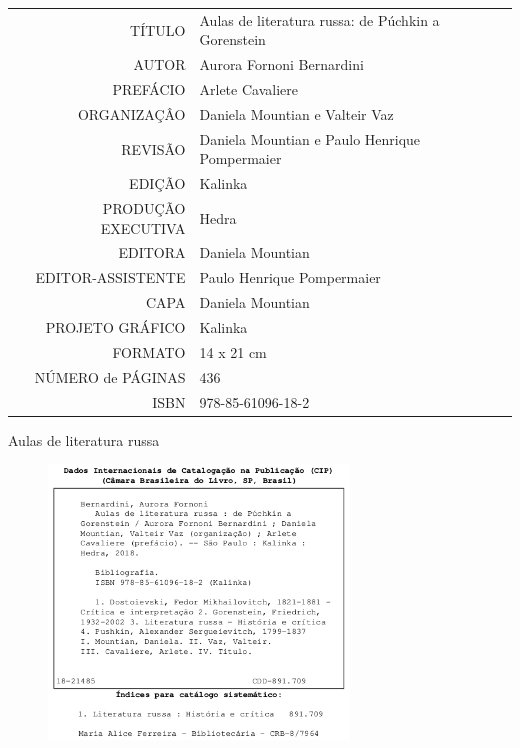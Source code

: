 \begin{vplace}[1]
\begin{table}[ht!]
\MyriadPro
\scriptsize
\begin{tabular}{rl}
TÍTULO            & Aulas de literatura russa: de Púchkin a Gorenstein \\[2pt]
AUTOR             & Aurora Fornoni Bernardini                          \\[2pt]
PREFÁCIO          & Arlete Cavaliere                                   \\[2pt]
ORGANIZAÇÂO       & Daniela Mountian e Valteir Vaz                     \\[2pt]
REVISÃO           & Daniela Mountian e Paulo Henrique Pompermaier      \\[2pt]
EDIÇÃO            & Kalinka                                            \\[2pt]
PRODUÇÃO EXECUTIVA & Hedra                                             \\[2pt]
EDITORA           & Daniela Mountian                                   \\[2pt] 
EDITOR-ASSISTENTE & Paulo Henrique Pompermaier                         \\[2pt]
CAPA              & Daniela Mountian                                   \\[2pt]
PROJETO GRÁFICO   & Kalinka                                            \\[2pt]
FORMATO           & 14 x 21 cm                                         \\[2pt]
NÚMERO de PÁGINAS & 436                                                \\[2pt]
ISBN              & 978-85-61096-18-2                                 
\end{tabular}
\end{table}
\end{vplace}

\newpage
\MyriadPro
\begin{center}
\small
Aulas de literatura russa
\end{center}

\scriptsize


\begin{figure}[!ht]
\centering

  \includegraphics[width=80mm]{./imgs/ficha.jpg}
 \end{figure}


